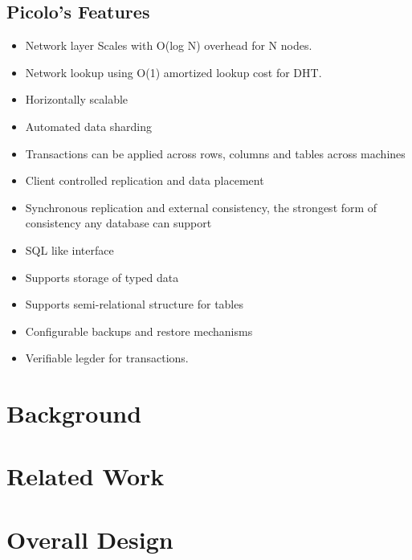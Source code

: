 \documentclass[a4paper]{article}
\begin{document}
\subsection{Picolo's Features}
\begin{itemize}
    \item Network layer Scales with O(log N) overhead for N nodes.
    \item Network lookup using O(1) amortized lookup cost for DHT.
    \item Horizontally scalable 
    \item Automated data sharding
    \item Transactions can be applied across rows, columns and tables across machines
    \item Client controlled replication and data placement
    \item Synchronous replication and external consistency, the strongest form of consistency any database can support
    \item SQL like interface
    \item Supports storage of typed data
    \item Supports semi-relational structure for tables
    \item Configurable backups and restore mechanisms
    \item Verifiable legder for transactions.
\end{itemize}

\section{Background}
    \begin{itemize}
    \end{itemize}

\section{Related Work}
\section{Overall Design}
\end{document}
